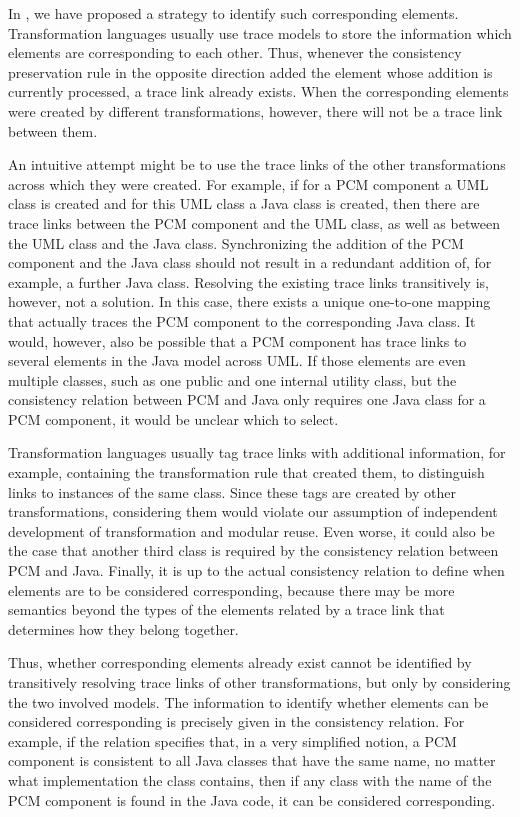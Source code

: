 In , we have proposed a strategy to identify such corresponding elements.
Transformation languages usually use trace models to store the information which elements are corresponding to each other.
Thus, whenever the consistency preservation rule in the opposite direction added the element whose addition is currently processed, a trace link already exists.
When the corresponding elements were created by different transformations, however, there will not be a trace link between them.

An intuitive attempt might be to use the trace links of the other transformations across which they were created.
For example, if for a \gls{PCM} component a UML class is created and for this UML class a Java class is created, then there are trace links between the \gls{PCM} component and the UML class, as well as between the UML class and the Java class.
Synchronizing the addition of the \gls{PCM} component and the Java class should not result in a redundant addition of, for example, a further Java class.
Resolving the existing trace links transitively is, however, not a solution.
In this case, there exists a unique one-to-one mapping that actually traces the \gls{PCM} component to the corresponding Java class.
It would, however, also be possible that a \gls{PCM} component has trace links to several elements in the Java model across UML.
If those elements are even multiple classes, such as one public and one internal utility class, but the consistency relation between \gls{PCM} and Java only requires one Java class for a \gls{PCM} component, it would be unclear which to select.

Transformation languages usually tag trace links with additional information, for example, containing the transformation rule that created them, to distinguish links to instances of the same class.
Since these tags are created by other transformations, considering them would violate our assumption of independent development of transformation and modular reuse.
Even worse, it could also be the case that another third class is required by the consistency relation between \gls{PCM} and Java.
Finally, it is up to the actual consistency relation to define when elements are to be considered corresponding, because there may be more semantics beyond the types of the elements related by a trace link that determines how they belong together.

Thus, whether corresponding elements already exist cannot be identified by transitively resolving trace links of other transformations, but only by considering the two involved models.
The information to identify whether elements can be considered corresponding is precisely given in the consistency relation.
For example, if the relation specifies that, in a very simplified notion, a \gls{PCM} component is consistent to all Java classes that have the same name, no matter what implementation the class contains, then if any class with the name of the \gls{PCM} component is found in the Java code, it can be considered corresponding.

